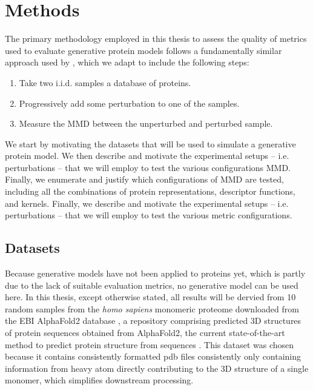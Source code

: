 \chapter{Methods}


The primary methodology employed in this thesis to assess the quality of metrics
used to evaluate generative protein models follows a fundamentally similar
approach used by \cite{o2021evaluation}, which we adapt to include the following
steps:

\begin{enumerate}
\item Take two i.i.d. samples a database of proteins.
\item Progressively add some perturbation to one of the samples.
\item Measure the MMD between the unperturbed and perturbed sample.
\end{enumerate}

We start by motivating the datasets that will be used to simulate a generative
protein model. We then describe and motivate the experimental setups -- i.e.
perturbations -- that we will employ to test the various configurations MMD.
Finally, we enumerate and justify which configurations of MMD are tested,
including all the combinations of protein representations, descriptor functions,
and kernels. Finally, we describe and motivate the experimental setups -- i.e.
perturbations -- that we will employ to test the various metric configurations.


\section{Datasets}

Because generative models have not been applied to proteins yet, which is partly
due to the lack of suitable evaluation metrics, no generative model can be used
here. In this thesis, except otherwise stated, all results will be dervied from
10 random samples from the \textit{homo sapiens} monomeric proteome downloaded
from the EBI AlphaFold2 database
\citep{varadi2022alphafold,tunyasuvunakool2021highly}, a repository comprising
predicted 3D structures of protein sequences obtained from AlphaFold2, the
current state-of-the-art method to predict protein structure from sequences
\citep{jumper2021highly}. This dataset was chosen because it contains
consistently formatted pdb files consistently only containing information from
heavy atom directly contributing to the 3D structure of a single monomer, which
simplifies downstream processing.

